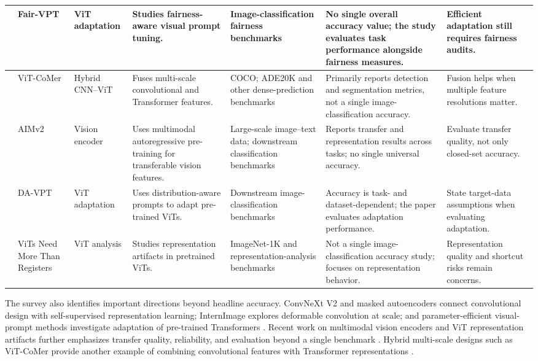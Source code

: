 \documentclass[conference]{IEEEtran}
\begin{document}
\begin{table}[!t]
\begin{tabularx}{\textwidth}{|>{\centering\arraybackslash}p{0.48cm}|p{1.28cm}|p{1.22cm}|X|p{1.42cm}|p{1.38cm}|X|}
\hline
2024 & Fair-VPT \cite{park2024fairvpt} & ViT adaptation & Studies fairness-aware visual prompt tuning. & Image-classification fairness benchmarks & No single overall accuracy value; the study evaluates task performance alongside fairness measures. & Efficient adaptation still requires fairness audits. \\
\hline
2024 & ViT-CoMer \cite{xia2024vitcomer} & Hybrid CNN--ViT & Fuses multi-scale convolutional and Transformer features. & COCO; ADE20K and other dense-prediction benchmarks & Primarily reports detection and segmentation metrics, not a single image-classification accuracy. & Fusion helps when multiple feature resolutions matter. \\
\hline
2025 & AIMv2 \cite{fini2025aimv2} & Vision encoder & Uses multimodal autoregressive pre-training for transferable vision features. & Large-scale image--text data; downstream classification benchmarks & Reports transfer and representation results across tasks; no single universal accuracy. & Evaluate transfer quality, not only closed-set accuracy. \\
\hline
2025 & DA-VPT \cite{ren2025davpt} & ViT adaptation & Uses distribution-aware prompts to adapt pre-trained ViTs. & Downstream image-classification benchmarks & Accuracy is task- and dataset-dependent; the paper evaluates adaptation performance. & State target-data assumptions when evaluating adaptation. \\
\hline
2026 & ViTs Need More Than Registers \cite{shi2026registers} & ViT analysis & Studies representation artifacts in pretrained ViTs. & ImageNet-1K and representation-analysis benchmarks & Not a single image-classification accuracy study; focuses on representation behavior. & Representation quality and shortcut risks remain concerns. \\
\hline
\end{tabularx}
\end{table}

The survey also identifies important directions beyond headline accuracy. ConvNeXt V2 and masked autoencoders connect convolutional design with self-supervised representation learning; InternImage explores deformable convolution at scale; and parameter-efficient visual-prompt methods investigate adaptation of pre-trained Transformers \cite{woo2023convnextv2,he2022mae,wang2023internimage,park2024fairvpt,ren2025davpt}. Recent work on multimodal vision encoders and ViT representation artifacts further emphasizes transfer quality, reliability, and evaluation beyond a single benchmark \cite{fini2025aimv2,shi2026registers}. Hybrid multi-scale designs such as ViT-CoMer provide another example of combining convolutional features with Transformer representations \cite{xia2024vitcomer}.
\end{document}
